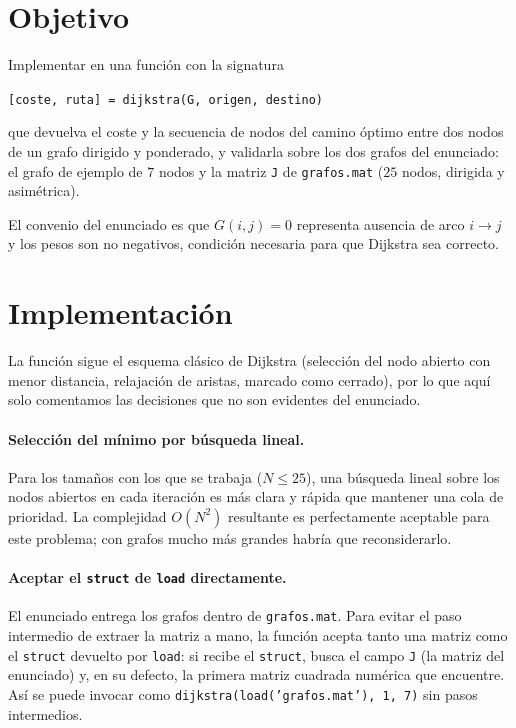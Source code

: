 \section{Objetivo}
Implementar en \matlab{} una funci\'{o}n con la signatura
\begin{center}
  \texttt{[coste, ruta] = dijkstra(G, origen, destino)}
\end{center}
que devuelva el coste y la secuencia de nodos del camino \'{o}ptimo entre dos nodos de un grafo dirigido y ponderado, y validarla sobre los dos grafos del enunciado: el grafo de ejemplo de $7$ nodos y la matriz \texttt{J} de \texttt{grafos.mat} ($25$ nodos, dirigida y asim\'{e}trica).

El convenio del enunciado es que $G(i,j) = 0$ representa ausencia de arco $i\to j$ y los pesos son no negativos, condici\'{o}n necesaria para que Dijkstra sea correcto.


\section{Implementaci\'{o}n}

La funci\'{o}n sigue el esquema cl\'{a}sico de Dijkstra (selecci\'{o}n del nodo abierto con menor distancia, relajaci\'{o}n de aristas, marcado como cerrado), por lo que aqu\'{i} solo comentamos las decisiones que no son evidentes del enunciado.

\paragraph{Selecci\'{o}n del m\'{i}nimo por b\'{u}squeda lineal.} Para los tama\~{n}os con los que se trabaja ($N \leq 25$), una b\'{u}squeda lineal sobre los nodos abiertos en cada iteraci\'{o}n es m\'{a}s clara y r\'{a}pida que mantener una cola de prioridad. La complejidad $O(N^2)$ resultante es perfectamente aceptable para este problema; con grafos mucho m\'{a}s grandes habr\'{i}a que reconsiderarlo.

\paragraph{Aceptar el \texttt{struct} de \texttt{load} directamente.} El enunciado entrega los grafos dentro de \texttt{grafos.mat}. Para evitar el paso intermedio de extraer la matriz a mano, la funci\'{o}n acepta tanto una matriz como el \texttt{struct} devuelto por \texttt{load}: si recibe el \texttt{struct}, busca el campo \texttt{J} (la matriz del enunciado) y, en su defecto, la primera matriz cuadrada num\'{e}rica que encuentre. As\'{i} se puede invocar como \texttt{dijkstra(load('grafos.mat'), 1, 7)} sin pasos intermedios.

